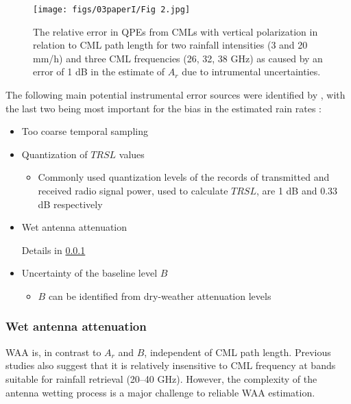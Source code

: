 \documentclass{ctuthesis}\usepackage[]{graphicx}\usepackage[]{color}
\begin{document}
\begin{figure}[h]
\begin{center}
\texttt{[image: figs/03paperI/Fig 2.jpg]}
\caption{The relative error in QPEs from CMLs with vertical polarization in relation to CML path length for two rainfall intensities (3 and 20 mm/h) and three CML frequencies (26, 32, 38 GHz) as caused by an error of 1 dB in the estimate of $A_r$ due to intrumental uncertainties.} \label{2The1}
\end{center}
\end{figure}

The following main potential instrumental error sources were identified by \cite{leijnseErrorsUncertaintiesMicrowave2010}, with the last two being most important for the bias in the estimated rain rates \citep{chwalaCommercialMicrowaveLink2019}: 
\begin{itemize}
        \item Too coarse temporal sampling
        \item Quantization of $TRSL$ values 
        \begin{itemize}
                \item Commonly used quantization levels of the records of transmitted and received radio signal power, used to calculate $TRSL$, are 1 dB and 0.33 dB respectively
        \end{itemize}
        \item Wet antenna attenuation
        \begin{itemize}
                Details in \ref{WAAtheor}
        \end{itemize}
        \item Uncertainty of the baseline level $B$
        \begin{itemize}
                \item $B$ can be identified from dry-weather attenuation levels
        \end{itemize}
\end{itemize}




\subsubsection{Wet antenna attenuation} \label{WAAtheor}

WAA is, in contrast to $A_r$ and $B$, independent of CML path length. Previous studies \citep{leijnseMicrowaveLinkRainfall2008, overeemMeasuringUrbanRainfall2011} also suggest that it is relatively insensitive to CML frequency at bands suitable for rainfall retrieval (20--40 GHz). However, the complexity of the antenna wetting process is a major challenge to reliable WAA estimation. 
\end{document}
